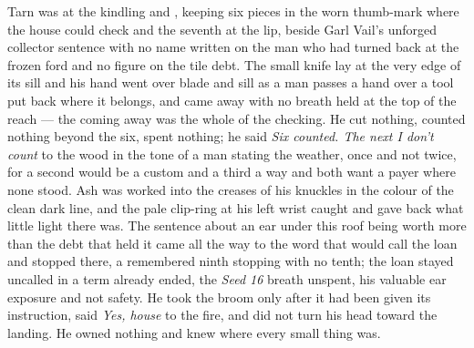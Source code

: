 Tarn was at the kindling and , keeping six pieces in the worn thumb-mark where the house could check and the seventh at the lip, beside Garl Vail's unforged collector sentence with no name written on the man who had turned back at the frozen ford and no figure on the tile debt. The small knife lay at the very edge of its sill and his hand went over blade and sill as a man passes a hand over a tool put back where it belongs, and came away with no breath held at the top of the reach --- the coming away was the whole of the checking. He cut nothing, counted nothing beyond the six, spent nothing; he said \emph{Six counted. The next I don’t count} to the wood in the tone of a man stating the weather, once and not twice, for a second would be a custom and a third a way and both want a payer where none stood. Ash was worked into the creases of his knuckles in the colour of the clean dark line, and the pale clip-ring at his left wrist caught and gave back what little light there was. The sentence about an ear under this roof being worth more than the debt that held it came all the way to the word that would call the loan and stopped there, a remembered ninth stopping with no tenth; the loan stayed uncalled in a term already ended, the \emph{Seed 16} breath unspent, his valuable ear exposure and not safety. He took the broom only after it had been given its instruction, said \emph{Yes, house} to the fire, and did not turn his head toward the landing. He owned nothing and knew where every small thing was.

